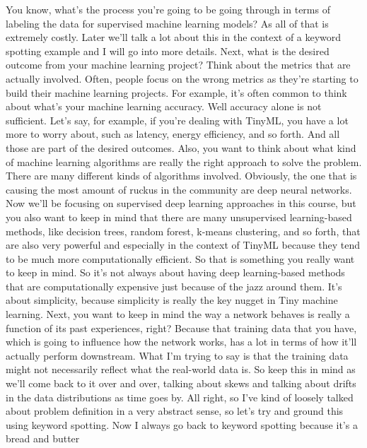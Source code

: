     You know, what's the process you're going
    to be going through in terms of labeling the data for supervised machine
    learning models?
    As all of that is extremely costly.
    Later we'll talk a lot about this in the context of a keyword spotting example
    and I will go into more details.
    Next, what is the desired outcome from your machine learning project?
    Think about the metrics that are actually involved.
    Often, people focus on the wrong metrics as they're
    starting to build their machine learning projects.
    For example, it's often common to think about what's
    your machine learning accuracy.
    Well accuracy alone is not sufficient.
    Let's say, for example, if you're dealing with TinyML,
    you have a lot more to worry about, such as latency, energy efficiency,
    and so forth.
    And all those are part of the desired outcomes.
    Also, you want to think about what kind of machine learning algorithms
    are really the right approach to solve the problem.
    There are many different kinds of algorithms involved.
    Obviously, the one that is causing the most amount of ruckus in the community
    are deep neural networks.
    Now we'll be focusing on supervised deep learning approaches in this course,
    but you also want to keep in mind that there
    are many unsupervised learning-based methods, like decision
    trees, random forest, k-means clustering, and so forth, that are also
    very powerful and especially in the context of TinyML
    because they tend to be much more computationally efficient.
    So that is something you really want to keep in mind.
    So it's not always about having deep learning-based methods that
    are computationally expensive just because of the jazz around them.
    It's about simplicity, because simplicity is really the key nugget
    in Tiny machine learning.
    Next, you want to keep in mind the way a network behaves
    is really a function of its past experiences, right?
    Because that training data that you have,
    which is going to influence how the network works,
    has a lot in terms of how it'll actually perform downstream.
    What I'm trying to say is that the training data might not necessarily
    reflect what the real-world data is.
    So keep this in mind as we'll come back to it over and over,
    talking about skews and talking about drifts in the data distributions
    as time goes by.
    All right, so I've kind of loosely talked
    about problem definition in a very abstract sense,
    so let's try and ground this using keyword spotting.
    Now I always go back to keyword spotting because it's a bread and butter
